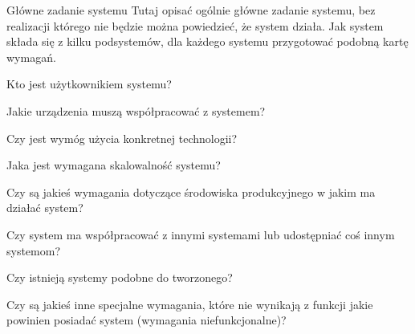 \documentclass[a4paper]{article}
\begin{document}
    \begin{userstory}{Główne zadanie systemu}
        Tutaj opisać ogólnie główne zadanie systemu, bez realizacji którego nie będzie można powiedzieć, że system działa. Jak system składa się z kilku podsystemów, dla każdego systemu przygotować podobną kartę wymagań.
        \begin{questions}
            \item{
                Kto jest użytkownikiem systemu?
            }
            \item{
                Jakie urządzenia muszą współpracować z systemem?
            }
            \item{
                Czy jest wymóg użycia konkretnej technologii?
            }
            \item{
                Jaka jest wymagana skalowalność systemu?
            }
            \item{
                Czy są jakieś wymagania dotyczące środowiska produkcyjnego w jakim ma działać system?
            }
            \item{
                Czy system ma współpracować z innymi systemami lub udostępniać coś innym systemom?
            }
            \item{
                Czy istnieją systemy podobne do tworzonego?
            }
            \item{
                Czy są jakieś inne specjalne wymagania, które nie wynikają z funkcji jakie powinien posiadać system (wymagania niefunkcjonalne)?
            }
        \end{questions}
    \end{userstory}
\end{document}
